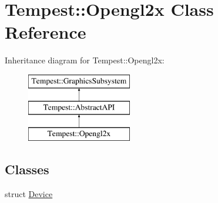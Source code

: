 \hypertarget{class_tempest_1_1_opengl2x}{\section{Tempest\+:\+:Opengl2x Class Reference}
\label{class_tempest_1_1_opengl2x}
}
Inheritance diagram for Tempest\+:\+:Opengl2x\+:\begin{figure}[H]
\begin{center}
\leavevmode
\includegraphics[height=3.000000cm]{class_tempest_1_1_opengl2x}
\end{center}
\end{figure}
\subsection*{Classes}
\begin{DoxyCompactItemize}
\item 
struct \hyperlink{struct_tempest_1_1_opengl2x_1_1_device}{Device}
\end{DoxyCompactItemize}
